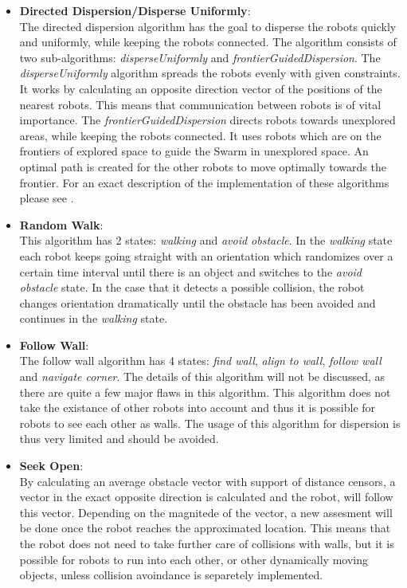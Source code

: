   \begin{itemize}
    \item \textbf{Directed Dispersion/Disperse Uniformly}\cite{mclurkin2007distributed}:\\
      The directed dispersion algorithm has the goal to disperse the robots quickly and uniformly, while keeping the robots connected. The algorithm consists of two sub-algorithms: \emph{disperseUniformly} and \emph{frontierGuidedDispersion}. The \emph{disperseUniformly} algorithm spreads the robots evenly with given constraints. It works by calculating an opposite direction vector of the positions of the nearest robots. This means that communication between robots is of vital importance. The \emph{frontierGuidedDispersion} directs robots towards unexplored areas, while keeping the robots connected. It uses robots which are on the frontiers of explored space to guide the Swarm in unexplored space. An optimal path is created for the other robots to move optimally towards the frontier. For an exact description of the implementation of these algorithms please see \cite{mclurkin2007distributed}.
    \item \textbf{Random Walk}\cite{morlok2007dispersing}:\\
      This algorithm has 2 states: \emph{walking} and \emph{avoid obstacle}. In the \emph{walking} state each robot keeps going straight with an orientation which randomizes over a certain time interval until there is an object and switches to the \emph{avoid obstacle} state. In the case that it detects a possible collision, the robot changes orientation dramatically until the obstacle has been avoided and continues in the \emph{walking} state.
    \item \textbf{Follow Wall}\cite{morlok2007dispersing}:\\
      The follow wall algorithm has 4 states: \emph{find wall}, \emph{align to wall}, \emph{follow wall} and \emph{navigate corner}. The details of this algorithm will not be discussed, as there are quite a few major flaws in this algorithm. This algorithm does not take the existance of other robots into account and thus it is possible for robots to see each other as walls. The usage of this algorithm for dispersion is thus very limited and should be avoided.
    \item \textbf{Seek Open}\cite{morlok2007dispersing}:\\
      By calculating an average obstacle vector with support of distance censors, a vector in the exact opposite direction is calculated and the robot, will follow this vector. Depending on the magnitede of the vector, a new assesment will be done once the robot reaches the approximated location. This means that the robot does not need to take further care of collisions with walls, but it is possible for robots to run into each other, or other dynamically moving objects, unless collision avoindance is separetely implemented.

\end{itemize}
